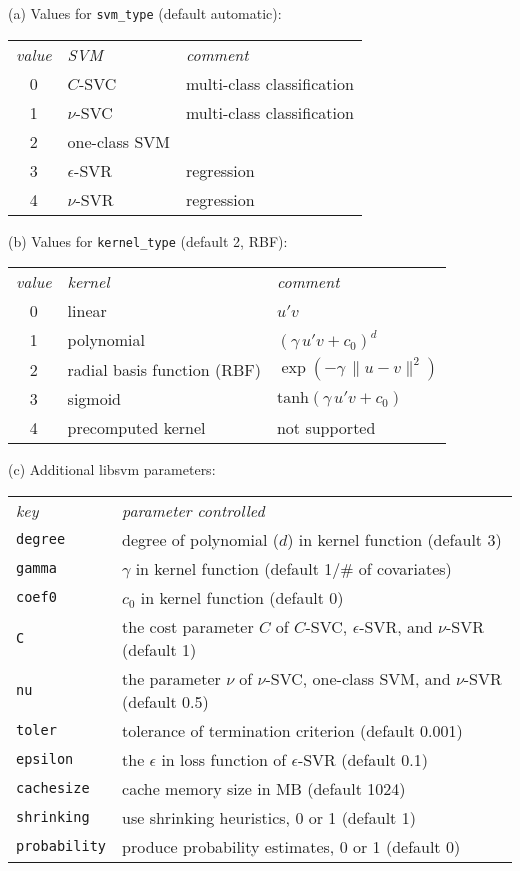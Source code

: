 \documentclass{article}
\begin{document}

\begin{table}[p]
  (a) Values for \texttt{svm\_type} (default automatic):
  \begin{center}
  \begin{tabular}{cll}
\textit{value} & \textit{SVM} & \textit{comment} \\[2pt]
0 & $C$-SVC & multi-class classification \\
1 & $\nu$-SVC & multi-class classification \\
2 & one-class SVM & \\
3 & $\epsilon$-SVR & regression \\
4 & $\nu$-SVR & regression   
  \end{tabular}
  \end{center}

  (b) Values for \texttt{kernel\_type} (default 2, RBF):
  \begin{center}
  \begin{tabular}{cll}
\textit{value} & \textit{kernel} & \textit{comment} \\[2pt]
0 & linear & $u'v$ \\
1 & polynomial & $(\gamma\, u'v + c_0)^d$ \\
2 & radial basis function (RBF) & $\exp(-\gamma\, \lVert u-v \rVert^2)$ \\
3 & sigmoid & $\mbox{tanh}(\gamma\, u'v + c_0)$ \\
4 & precomputed kernel & not supported
  \end{tabular}
  \end{center}

  (c) Additional \textsf{libsvm} parameters:
  \begin{center}
  \begin{tabular}{ll}
    \textit{key} & \textit{parameter controlled} \\[2pt]
\texttt{degree} & degree of polynomial ($d$) in kernel function (default 3) \\
\texttt{gamma} & $\gamma$ in kernel function (default 1/\# of covariates) \\
\texttt{coef0} & $c_0$ in kernel function (default 0) \\
\texttt{C} & the cost parameter $C$ of $C$-SVC, $\epsilon$-SVR, and $\nu$-SVR (default 1) \\
\texttt{nu} & the parameter $\nu$ of $\nu$-SVC, one-class SVM, and $\nu$-SVR (default
     0.5) \\
\texttt{toler} & tolerance of termination criterion (default 0.001) \\
\texttt{epsilon} & the $\epsilon$ in loss function of $\epsilon$-SVR (default 0.1) \\
\texttt{cachesize} & cache memory size in MB (default 1024) \\
\texttt{shrinking} & use shrinking heuristics, 0 or 1 (default 1) \\
\texttt{probability} & produce probability estimates, 0 or 1 (default 0)
  \end{tabular}
  \end{center}


\end{table}
\end{document}
